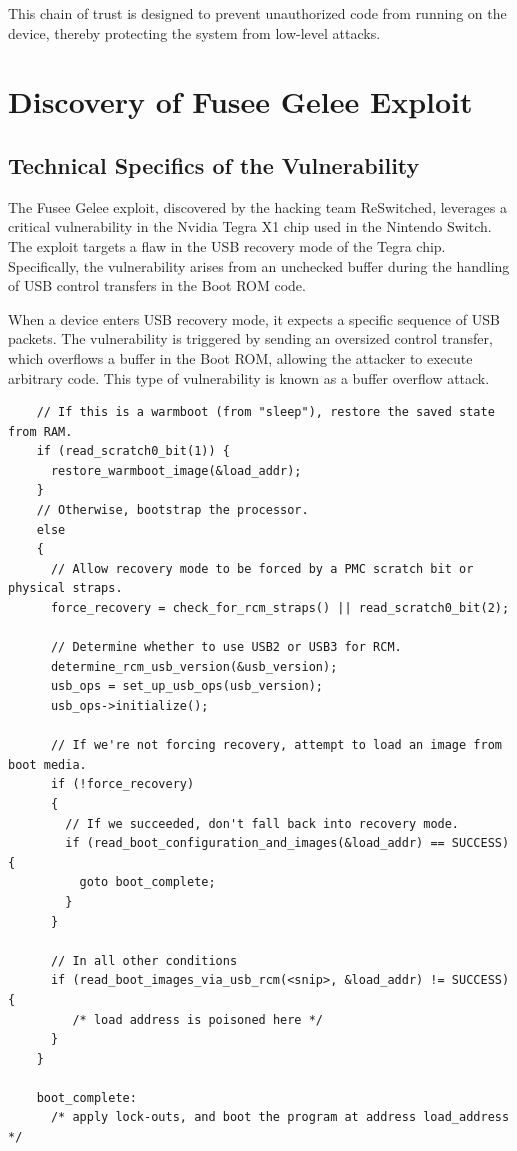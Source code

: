 This chain of trust is designed to prevent unauthorized code from running on the device, thereby protecting the system from low-level attacks.

\section{Discovery of Fusee Gelee Exploit}

\subsection{Technical Specifics of the Vulnerability}

The Fusee Gelee exploit, discovered by the hacking team ReSwitched, leverages a critical vulnerability in the Nvidia Tegra X1 chip used in the Nintendo Switch. The exploit targets a flaw in the USB recovery mode of the Tegra chip. Specifically, the vulnerability arises from an unchecked buffer during the handling of USB control transfers in the Boot ROM code\cite{roussel-tarbouriechMethodicallyDefeatingNintendo2019}\cite{WaybackMachine2019}.

When a device enters USB recovery mode, it expects a specific sequence of USB packets. The vulnerability is triggered by sending an oversized control transfer, which overflows a buffer in the Boot ROM, allowing the attacker to execute arbitrary code. This type of vulnerability is known as a buffer overflow attack\cite{BufferOverflow2024}.

\begin{verbatim}
    // If this is a warmboot (from "sleep"), restore the saved state from RAM.
    if (read_scratch0_bit(1)) {
      restore_warmboot_image(&load_addr);
    }
    // Otherwise, bootstrap the processor.
    else
    {
      // Allow recovery mode to be forced by a PMC scratch bit or physical straps.
      force_recovery = check_for_rcm_straps() || read_scratch0_bit(2);
    
      // Determine whether to use USB2 or USB3 for RCM.
      determine_rcm_usb_version(&usb_version);
      usb_ops = set_up_usb_ops(usb_version);
      usb_ops->initialize();
    
      // If we're not forcing recovery, attempt to load an image from boot media.
      if (!force_recovery)
      {
        // If we succeeded, don't fall back into recovery mode.
        if (read_boot_configuration_and_images(&load_addr) == SUCCESS) {
          goto boot_complete;
        }
      }
    
      // In all other conditions
      if (read_boot_images_via_usb_rcm(<snip>, &load_addr) != SUCCESS) {
         /* load address is poisoned here */
      }
    }
    
    boot_complete:
      /* apply lock-outs, and boot the program at address load_address */
\end{verbatim}

